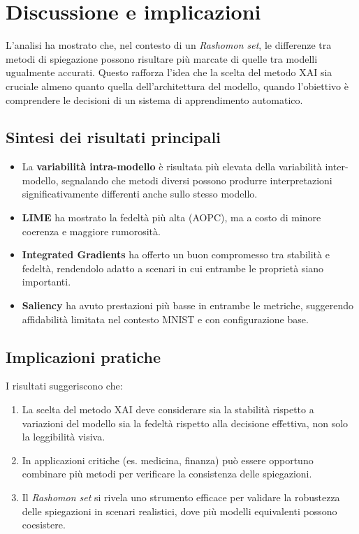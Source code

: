 \documentclass{article}
\begin{document}
\section{Discussione e implicazioni}

L’analisi ha mostrato che, nel contesto di un \emph{Rashomon set}, le
differenze tra metodi di spiegazione possono risultare più marcate di quelle
tra modelli ugualmente accurati. Questo rafforza l’idea che la scelta del
metodo XAI sia cruciale almeno quanto quella dell’architettura del modello,
quando l’obiettivo è comprendere le decisioni di un sistema di apprendimento
automatico.

\subsection{Sintesi dei risultati principali}
\begin{itemize}
      \item La \textbf{variabilità intra-modello} è risultata più elevata della variabilità
            inter-modello, segnalando che metodi diversi possono produrre interpretazioni
            significativamente differenti anche sullo stesso modello.
      \item \textbf{LIME} ha mostrato la fedeltà più alta (AOPC), ma a costo di minore coerenza e maggiore rumorosità.
      \item \textbf{Integrated Gradients} ha offerto un buon compromesso tra stabilità e fedeltà, rendendolo adatto a scenari in cui entrambe le proprietà siano importanti.
      \item \textbf{Saliency} ha avuto prestazioni più basse in entrambe le metriche, suggerendo affidabilità limitata nel contesto MNIST e con configurazione base.
\end{itemize}

\subsection{Implicazioni pratiche}
I risultati suggeriscono che:
\begin{enumerate}
      \item La scelta del metodo XAI deve considerare sia la stabilità rispetto a
            variazioni del modello sia la fedeltà rispetto alla decisione effettiva, non
            solo la leggibilità visiva.
      \item In applicazioni critiche (es. medicina, finanza) può essere opportuno combinare
            più metodi per verificare la consistenza delle spiegazioni.
      \item Il \emph{Rashomon set} si rivela uno strumento efficace per validare la
            robustezza delle spiegazioni in scenari realistici, dove più modelli
            equivalenti possono coesistere.
\end{enumerate}
\end{document}
